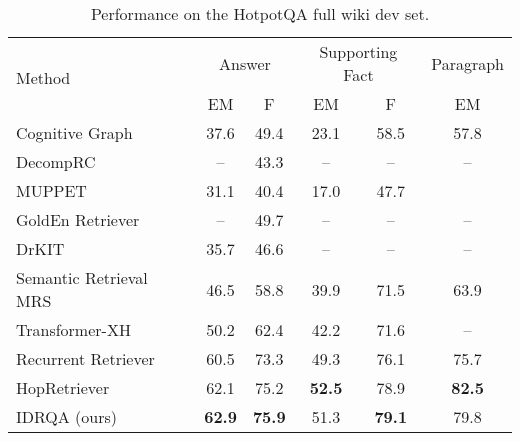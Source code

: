 \documentclass[sigconf]{acmart}
\begin{document}
\setlength\tabcolsep{16pt}
\begin{table*}[]
\centering
\caption{Performance on the HotpotQA full wiki dev set. }
\label{table:overall qa performance on dev}
\begin{tabular}{@{}lccccc@{}}
\toprule
\multirow{2}{*}{Method} & \multicolumn{2}{c}{Answer} & \multicolumn{2}{c}{Supporting Fact} & Paragraph \\ \cmidrule(l){2-6} 
 & EM & F & EM & F & EM \\ \midrule
Cognitive Graph \citep{ding-etal-2019-cognitive} & 37.6 & 49.4 & 23.1 & 58.5 & 57.8 \\
DecompRC \citep{min-etal-2019-multi} & -- & 43.3 & -- & -- & -- \\
MUPPET \citep{feldman-el-yaniv-2019-multi} & 31.1 & 40.4 & 17.0 & 47.7 &  \\
GoldEn Retriever \citep{qi-etal-2019-answering} & -- & 49.7 & -- & -- & -- \\
DrKIT \citep{Dhingra2020Differentiable} & 35.7 & 46.6 & -- & -- & -- \\
Semantic Retrieval MRS \citep{nie-etal-2019-revealing} & 46.5 & 58.8 & 39.9 & 71.5 & 63.9 \\
Transformer-XH \citep{zhaotransxh2020} & 50.2 & 62.4 & 42.2 & 71.6 & -- \\
Recurrent Retriever \citep{asai2020learning} & 60.5 & 73.3 & 49.3 & 76.1 & 75.7 \\
HopRetriever \citep{li2020hopretriever} & 62.1 & 75.2 & \textbf{52.5} & 78.9 & \textbf{82.5} \\
\midrule
IDRQA (ours) & \textbf{62.9} & \textbf{75.9} & 51.3 & \textbf{79.1} & 79.8 \\ \bottomrule
\end{tabular}
\end{table*}
\end{document}
